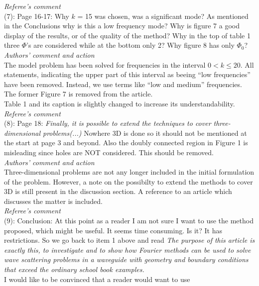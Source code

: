 \documentclass[a4paper,12pt]{article}%
\begin{document}
{\it Referee's comment}\\
(7): Page 16-17: Why $k$ = 15 was chosen, was a significant mode? As
mentioned in the Conclusions why is this a low frequency mode? Why is
figure 7 a good display of the results, or of the quality of the
method? Why in the top of table 1 three $\Phi$'s are
considered while at the bottom only 2? Why figure 8 has only $\Phi_0$?\\
{\it Authors' comment and action}\\
The model problem has been solved for frequencies in the interval
$0<k\le20$. All statements, indicating the upper part of this interval
as beeing ``low frequencies'' have been removed. Instead, we use
terms like  ``low and medium'' frequencies.\\
The former Figure 7 is removed from the article.\\
Table 1 and its caption is slightly changed to increase its
understandability. \\
\newline
{\it Referee's comment}\\
(8): Page 18: \textit{Finally, it is possible to extend the techniques
  to cover three-dimensional problems(...)} Nowhere 3D is done so it
should not be mentioned at the start at page 3 and beyond. Also the
doubly connected region in Figure 1 is misleading since holes are
NOT considered. This should be removed.\\
{\it Authors' comment and action}\\
Three-dimensional problems are not any longer included in the initial
formulation of the problem. However, a note on the possibilty to
extend the methods to cover 3D is still present in the discussion
section. A reference to an article which discusses the matter is
included. \\
\newline
{\it Referee's comment}\\
(9): Conclusion: At this point as a reader I am not sure I want to use
the method proposed, which might be useful. It seems time
consuming. Is it? It has restrictions.  So we go back to item 1 above
and read \textit{The purpose of this article is exactly this, to
  investigate and to show how Fourier methods can be used to solve
  wave scattering problems in a waveguide with geometry and boundary
  conditions that exceed the ordinary
  school book examples.}\\
\newline I would like to be convinced that a reader would want to use
\end{document}
